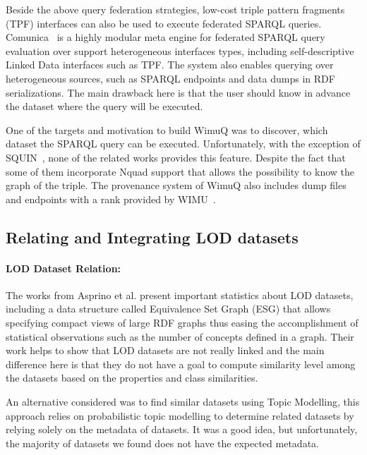 \documentclass[sw]{iosart2x}
\begin{document}
Beside the above query federation strategies, low-cost triple pattern fragments (TPF) interfaces \cite{verborgh2016triple} can also be used to execute federated SPARQL queries.
Comunica~\cite{taelman2018comunica} is a highly modular meta engine for federated SPARQL query evaluation over support heterogeneous interfaces types, including self-descriptive Linked Data interfaces such as TPF.
The system also enables querying over heterogeneous sources, such as SPARQL endpoints and data dumps in RDF serializations.
The main drawback here is that the user should know in advance the dataset where the query will be executed.

One of the targets and motivation to build WimuQ was to discover, which dataset the SPARQL query can be executed.
Unfortunately, with the exception of SQUIN~\cite{hartig2013squin}, none of the related works provides this feature.
Despite the fact that some of them incorporate Nquad support that allows the possibility to know the graph of the triple.
The provenance system of WimuQ also includes dump files and endpoints with a rank provided by WIMU~\cite{valdestilhas2018my}.

\subsection{Relating and Integrating LOD datasets} \label{sec:relod_rel}

\paragraph*{\textbf{LOD Dataset Relation:}}
The works from Asprino et al. \cite{asprino2019linked,asprino2019observing,asprino2019triplifying} present important statistics about LOD datasets, including a data structure called Equivalence Set Graph (ESG) that allows specifying compact views of large RDF graphs thus easing the accomplishment of statistical observations such as the number of concepts defined in a graph.
Their work helps to show that LOD datasets are not really linked and the main difference here is that they do not have a goal to compute similarity level among the datasets based on the properties and class similarities.

An alternative considered was to find similar datasets using Topic Modelling\cite{roder2016detecting}, this approach relies on probabilistic topic modelling to determine related datasets by relying solely on the metadata of datasets. It was a good idea, but unfortunately, the majority of datasets we found does not have the expected metadata. 
\end{document}
